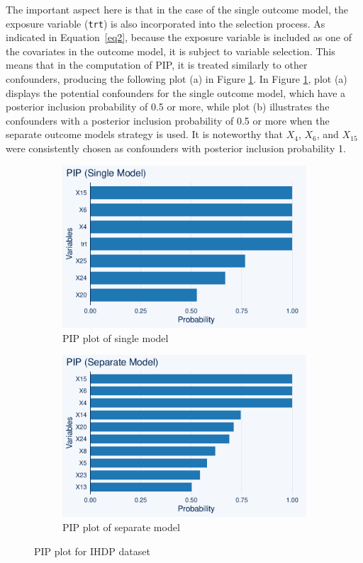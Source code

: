 The important aspect here is that in the case of the single outcome model, the exposure variable (\verb|trt|) is also incorporated into the selection process. As indicated in Equation~\ref{eq2}, because the exposure variable is included as one of the covariates in the outcome model, it is subject to variable selection. This means that in the computation of PIP, it is treated similarly to other confounders, producing the following plot (a) in Figure \ref{fig:ihdp_pip}. In Figure \ref{fig:ihdp_pip}, plot (a) displays the potential confounders for the single outcome model, which have a posterior inclusion probability of 0.5 or more, while plot (b) illustrates the confounders with a posterior inclusion probability of 0.5 or more when the separate outcome models strategy is used. It is noteworthy that $X_4$, $X_6$, and $X_{15}$ were consistently chosen as confounders with posterior inclusion probability 1.

\begin{figure}[htbp]
\begin{subfigure}{0.5\textwidth}
\includegraphics[width=\linewidth]{fig/ihdp_PIP_threshold_single.pdf}
\caption{PIP plot of single model}
\end{subfigure}%
\begin{subfigure}{0.5\textwidth}
\includegraphics[width=\linewidth]{fig/ihdp_PIP_threshold_separate.pdf}
\caption{PIP plot of separate model}
\end{subfigure}
\caption{PIP plot for IHDP dataset}\label{fig:ihdp_pip}
\end{figure}



